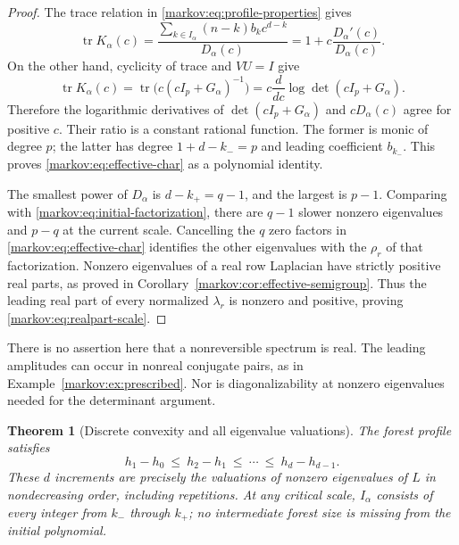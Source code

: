 \documentclass[11pt]{article}
\numberwithin{equation}{section}
\newtheorem{theorem}{Theorem}[section]
\theoremstyle{definition}
\theoremstyle{remark}
\newcommand{\tr}{\operatorname{tr}}
\begin{document}
\begin{proof}
The trace relation in \eqref{markov:eq:profile-properties} gives
\begin{equation}\label{markov:eq:trace-log}
 \tr K_\alpha(c)
 =\frac{\sum_{k\in I_\alpha}(n-k)b_kc^{d-k}}{D_\alpha(c)}
 =1+c\frac{D_\alpha'(c)}{D_\alpha(c)}.
\end{equation}
On the other hand, cyclicity of trace and $VU=I$ give
\[
 \tr K_\alpha(c)=\tr\bigl(c(cI_p+G_\alpha)^{-1}\bigr)
 =c\frac{d}{dc}\log\det(cI_p+G_\alpha).
\]
Therefore the logarithmic derivatives of
$\det(cI_p+G_\alpha)$ and $cD_\alpha(c)$ agree for positive $c$. Their ratio is
a constant rational function. The former is monic of degree $p$; the latter
has degree $1+d-k_-=p$ and leading coefficient $b_{k_-}$. This proves
\eqref{markov:eq:effective-char} as a polynomial identity.

The smallest power of $D_\alpha$ is $d-k_+=q-1$, and the largest is $p-1$.
Comparing with \eqref{markov:eq:initial-factorization}, there are $q-1$ slower
nonzero eigenvalues and $p-q$ at the current scale. Cancelling the $q$ zero
factors in \eqref{markov:eq:effective-char} identifies the other eigenvalues with the
$\rho_r$ of that factorization. Nonzero eigenvalues of a real row Laplacian have
strictly positive real parts, as proved in Corollary~\ref{markov:cor:effective-semigroup}.
Thus the leading real part of every normalized $\lambda_r$ is nonzero and
positive, proving \eqref{markov:eq:realpart-scale}.
\end{proof}

There is no assertion here that a nonreversible spectrum is real. The leading
amplitudes can occur in nonreal conjugate pairs, as in
Example~\ref{markov:ex:prescribed}. Nor is diagonalizability at nonzero eigenvalues
needed for the determinant argument.

\begin{theorem}[Discrete convexity and all eigenvalue valuations]
\label{markov:thm:convexity}
The forest profile satisfies
\begin{equation}\label{markov:eq:convexity}
 h_1-h_0\ \le\ h_2-h_1\ \le\ \cdots\ \le\ h_d-h_{d-1}.
\end{equation}
These $d$ increments are precisely the valuations of nonzero eigenvalues of $L$ in
nondecreasing order, including repetitions. At any critical scale,
$I_\alpha$ consists of every integer from $k_-$ through $k_+$; no intermediate
forest size is missing from the initial polynomial.
\end{theorem}
\end{document}
